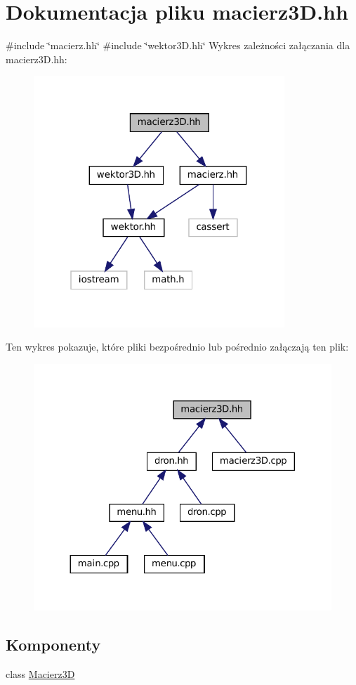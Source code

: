\hypertarget{macierz3_d_8hh}{}\section{Dokumentacja pliku macierz3\+D.\+hh}
\label{macierz3_d_8hh}
{\ttfamily \#include \char`\"{}macierz.\+hh\char`\"{}}\newline
{\ttfamily \#include \char`\"{}wektor3\+D.\+hh\char`\"{}}\newline
Wykres zależności załączania dla macierz3\+D.\+hh\+:\nopagebreak
\begin{figure}[H]
\begin{center}
\leavevmode
\includegraphics[width=268pt]{macierz3_d_8hh__incl}
\end{center}
\end{figure}
Ten wykres pokazuje, które pliki bezpośrednio lub pośrednio załączają ten plik\+:
\nopagebreak
\begin{figure}[H]
\begin{center}
\leavevmode
\includegraphics[width=324pt]{macierz3_d_8hh__dep__incl}
\end{center}
\end{figure}
\subsection*{Komponenty}
\begin{DoxyCompactItemize}
\item 
class \mbox{\hyperlink{class_macierz3_d}{Macierz3D}}
\end{DoxyCompactItemize}
